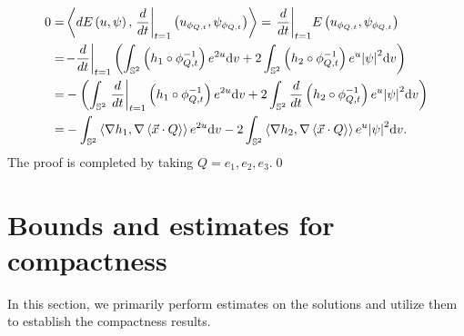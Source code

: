 \documentclass[a4paper, 12pt]{article}
\begin{document}
\[\begin{aligned}
	0 =& \left\langle {dE\left( {{u},{\psi }} \right),{{\left. {\frac{d}{{dt}}} \right|}_{t = 1}}\left( {{u_{{\phi _{Q,t}}}},{\psi _{{\phi _{Q,t}}}}} \right)} \right\rangle
	= {\left. {\frac{d}{{dt}}} \right|_{t = 1}}E\left( {{u_{{\phi _{Q,t}}}},{\psi _{{\phi _{Q,t}}}}} \right) \hfill \\
	=& {\left. { - \frac{d}{{dt}}} \right|_{t = 1}}\left( {\int_{{\mathbb{S}^2}} {\left( {{h_1}\circ \phi _{Q,t}^{ - 1}} \right){e^{2{u}}}{\text{d}}v + 2\int_{{\mathbb{S}^2}} {\left( {{h_2}\circ \phi _{Q,t}^{ - 1}} \right){e^{{u}}}{{\left| {{\psi }} \right|}^2}{\text{d}}v} } } \right) \hfill \\
	=&  - \left( {\int_{{\mathbb{S}^2}} {{{\left. {\frac{d}{{dt}}} \right|}_{t = 1}}\left( {{h_1}\circ \phi _{Q,t}^{ - 1}} \right){e^{2{u}}}{\text{d}}v}  + 2\int_{{\mathbb{S}^2}} {\frac{d}{{dt}}\left( {{h_2}\circ \phi _{Q,t}^{ - 1}} \right){e^{{u}}}{{\left| {{\psi }} \right|}^2}{\text{d}}v} } \right) \hfill \\
	=&  - \int_{{\mathbb{S}^2}} {\left\langle {\nabla {h_1},\nabla \left\langle {\vec x \cdot Q} \right\rangle } \right\rangle {e^{2{u}}}{\text{d}}v}  - 2\int_{{\mathbb{S}^2}} {\left\langle {\nabla {h_2},\nabla \left\langle {\vec x \cdot Q} \right\rangle } \right\rangle {e^{{u}}}{{\left| {{\psi }} \right|}^2}{\text{d}}v} .
\end{aligned} \]
The proof is completed by taking \( Q = e_1, e_2, e_3 \).\qed
\section{Bounds and estimates for compactness}
In this section, we primarily perform estimates on the solutions and utilize them to establish the compactness results.

\
\end{document}
